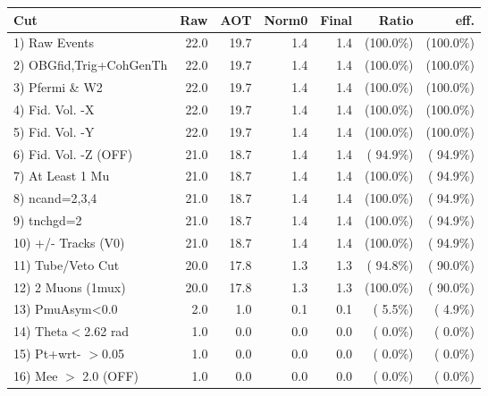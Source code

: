  \begin{table}[h!]\centering
 \begin{tabular}{||l||r|r|r|r|r|r||}
 \hline
 \hline
 Cut & Raw & AOT & Norm0 & Final & Ratio & eff.       \\
 \hline
  1) Raw Events           &         22.0 &         19.7 &          1.4 &          1.4 & (100.0\%) & (100.0\%) \\
  2) OBGfid,Trig+CohGenTh &         22.0 &         19.7 &          1.4 &          1.4 & (100.0\%) & (100.0\%) \\
  3) Pfermi \& W2         &         22.0 &         19.7 &          1.4 &          1.4 & (100.0\%) & (100.0\%) \\
  4) Fid. Vol. -X         &         22.0 &         19.7 &          1.4 &          1.4 & (100.0\%) & (100.0\%) \\
  5) Fid. Vol. -Y         &         22.0 &         19.7 &          1.4 &          1.4 & (100.0\%) & (100.0\%) \\
  6) Fid. Vol. -Z (OFF)   &         21.0 &         18.7 &          1.4 &          1.4 & ( 94.9\%) & ( 94.9\%) \\
  7) At Least 1 Mu        &         21.0 &         18.7 &          1.4 &          1.4 & (100.0\%) & ( 94.9\%) \\
  8) ncand=2,3,4          &         21.0 &         18.7 &          1.4 &          1.4 & (100.0\%) & ( 94.9\%) \\
  9) tnchgd=2             &         21.0 &         18.7 &          1.4 &          1.4 & (100.0\%) & ( 94.9\%) \\
 10) +/- Tracks (V0)      &         21.0 &         18.7 &          1.4 &          1.4 & (100.0\%) & ( 94.9\%) \\
 11) Tube/Veto Cut        &         20.0 &         17.8 &          1.3 &          1.3 & ( 94.8\%) & ( 90.0\%) \\
 12) 2 Muons (1mux)       &         20.0 &         17.8 &          1.3 &          1.3 & (100.0\%) & ( 90.0\%) \\
 13) PmuAsym<0.0          &          2.0 &          1.0 &          0.1 &          0.1 & (  5.5\%) & (  4.9\%) \\
 14) Theta$<$2.62 rad     &          1.0 &          0.0 &          0.0 &          0.0 & (  0.0\%) & (  0.0\%) \\
 15) Pt+wrt- $>$0.05      &          1.0 &          0.0 &          0.0 &          0.0 & (  0.0\%) & (  0.0\%) \\
 16) Mee $>$ 2.0  (OFF)   &          1.0 &          0.0 &          0.0 &          0.0 & (  0.0\%) & (  0.0\%) \\

\end{tabular}
\end{table}
